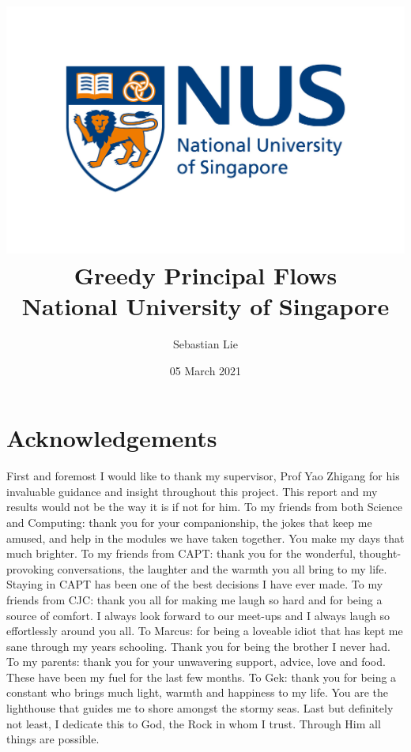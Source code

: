 \documentclass[12pt]{report}
\begin{document}
\title{
{\includegraphics[width=0.7\columnwidth]{university.jpg}}\\
{Greedy Principal Flows}\\
{\large National University of Singapore}\\
}
\author{Sebastian Lie}
\date{05 March 2021}
\maketitle

\chapter*{Acknowledgements}
First and foremost I would like to thank my supervisor, Prof Yao Zhigang
for his invaluable guidance and insight throughout this project. This report
and my results would not be the way it is if not for him. To my friends
from both Science and Computing: thank you for your companionship, 
the jokes that keep me amused, and help in the 
modules we have taken together. You make my days that much brighter. 
To my friends from CAPT: thank you for the wonderful, thought-provoking conversations,
the laughter and the warmth you all bring to my life. 
Staying in CAPT has been one of the best decisions I have ever made.
To my friends from CJC: thank you all for making me laugh so hard and for being 
a source of comfort. I always look forward to our meet-ups and I always laugh so 
effortlessly around you all.
To Marcus: for being a loveable idiot that has kept me sane through my years schooling. 
Thank you for being the brother I never had.
To my parents: thank you for your unwavering support, advice, love and food.
These have been my fuel for the last few months. 
To Gek: thank you for being a constant who brings much light, warmth and 
happiness to my life. You are the 
lighthouse that guides me to shore amongst the stormy seas. 
Last but definitely not least, I dedicate this to God, the Rock in whom I trust. 
Through Him all things are possible.
\end{document}
